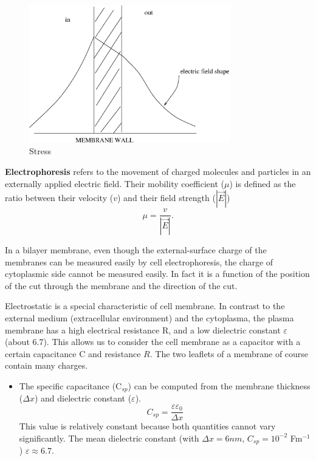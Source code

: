 \begin{figure}[htb]
  \centerline{\includegraphics[height=6cm]{./images/membrane-wall.eps}}
  \caption{Stress}\label{fig:membrane-wall}
\end{figure}

{\bf Electrophoresis} refers to the movement of charged molecules and
particles in an externally applied electric field. Their mobility
coefficient ($\mu$) is defined as the ratio between their velocity
($v$) and their field strength ($|\vec{E}|$)
\begin{equation}
  \label{eq:137}
  \mu = \frac{v}{|\vec{E}|}.
\end{equation}

In a bilayer membrane, even though the external-surface charge of the
membranes can be measured easily by cell electrophoresis, the charge
of cytoplasmic side cannot be measured easily. In fact it is a
function of the position of the cut through the membrane and the
direction of the cut.


Electrostatic is a special characteristic of cell membrane. In contrast
to the external medium (extracellular environment) and the cytoplasma,
the plasma membrane has a high electrical resistance R, and a low
dielectric constant $\varepsilon$ (about 6.7).  This allows us to
consider the cell membrane as a capacitor with a certain capacitance C
and resistance $R$. The two leaflets of a membrane of course contain
many charges.

\begin{itemize}
\item The specific capacitance (C$_{sp}$) can be computed from the
  membrane thickness ($\Delta x$) and dielectric constant
  ($\varepsilon$). 
  \begin{equation}
    C_{sp} = \frac{\varepsilon\varepsilon_0}{\Delta x}
  \end{equation}
  This value is relatively constant because both quantities cannot
  vary significantly.  The mean dielectric constant (with $\Delta x =
  6nm$, $C_{sp} = 10^{-2}$ Fm$^{-1}$) $\varepsilon \approx 6.7$.

\end{itemize}

